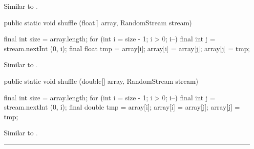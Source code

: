 \begin{tabb} Similar to .
\end{tabb}
\begin{htmlonly}
\end{htmlonly}
\begin{code}

   public static void shuffle (float[] array, RandomStream stream)\begin{hide} {
      final int size = array.length;
      for (int i = size - 1; i > 0; i--) {
         final int j = stream.nextInt (0, i);
         final float tmp = array[i];
         array[i] = array[j];
         array[j] = tmp;
      }
   }\end{hide}
\end{code}
\begin{tabb} Similar to .
\end{tabb}
\begin{htmlonly}
\end{htmlonly}
\begin{code}

   public static void shuffle (double[] array, RandomStream stream)\begin{hide} {
      final int size = array.length;
      for (int i = size - 1; i > 0; i--) {
         final int j = stream.nextInt (0, i);
         final double tmp = array[i];
         array[i] = array[j];
         array[j] = tmp;
      }
   }\end{hide}
\end{code}
\begin{tabb}  Similar to .
\bigskip\hrule
\end{tabb}
\begin{htmlonly}
\end{htmlonly}

